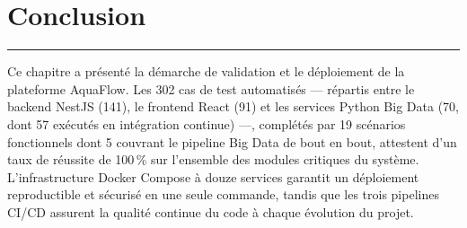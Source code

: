 \section*{Conclusion}
\vspace{-0.6cm}
\noindent\rule{\textwidth}{0.2pt}
\vspace{0.05cm}
\large

Ce chapitre a présenté la démarche de validation et le déploiement de la plateforme
AquaFlow. Les 302 cas de test automatisés — répartis entre le backend NestJS (141),
le frontend React (91) et les services Python Big Data (70, dont 57 exécutés en
intégration continue) —, complétés par 19 scénarios fonctionnels dont 5 couvrant
le pipeline Big Data de bout en bout, attestent d'un taux de réussite de 100\,\%
sur l'ensemble des modules critiques du système.
L'infrastructure Docker Compose à douze services garantit un déploiement
reproductible et sécurisé en une seule commande, tandis que les trois pipelines
CI/CD assurent la qualité continue du code à chaque évolution du projet.

